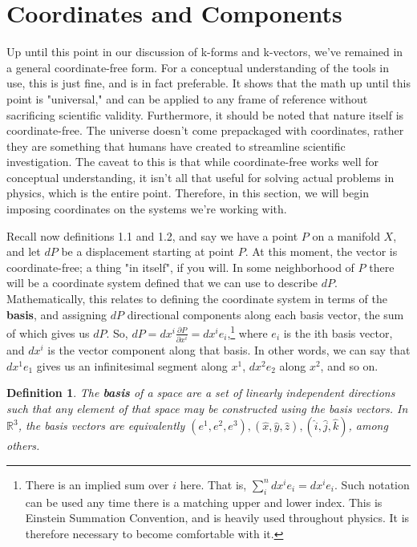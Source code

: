 \documentclass{book}
\newtheorem{defn}[equation]{Definition}
\begin{document}
\section{Coordinates and Components} 





Up until this point in our discussion of k-forms and k-vectors, we've remained in a general coordinate-free form. For a conceptual understanding of the tools in use, this is just fine, and is in fact preferable. It shows that the math up until this point is "universal," and can be applied to any frame of reference without sacrificing scientific validity. Furthermore, it should be noted that nature itself is coordinate-free. The universe doesn't come prepackaged with coordinates, rather they are something that humans have created to streamline scientific investigation. The caveat to this is that while coordinate-free works well for conceptual understanding, it isn't all that useful for solving actual problems in physics, which is the entire point. Therefore, in this section, we will begin imposing coordinates on the systems we're working with. 


Recall now definitions 1.1 and 1.2, and say we have a point $P$ on a manifold $X$, and let $dP$ be a displacement starting at point $P$. At this moment, the vector is coordinate-free; a thing "in itself", if you will. In some neighborhood of $P$ there will be a coordinate system defined that we can use to describe $dP$. Mathematically, this relates to defining the coordinate system in terms of the \textbf{basis}, and assigning $dP$ directional components  along each basis vector, the sum of which gives us $dP$. So, $dP = dx^i \frac{\partial P}{\partial x^i} = dx^i e_i$,\footnote{There is an implied sum over $i$ here. That is, $\sum_i^n dx^i e_i = dx^i e_i$. Such notation can be used any time there is a matching upper and lower index. This is Einstein Summation Convention, and is heavily used throughout physics. It is therefore necessary to become comfortable with it.} where $e_i$ is the ith basis vector, and $dx^i$ is the vector component along that basis. In other words, we can say that $dx^1e_1$ gives us an infinitesimal segment along $x^1$, $dx^2e_2$ along $x^2$, and so on. 


\begin{defn}
	The \textbf{basis} of a space are a set of linearly independent directions such that any element of that space may be constructed using the basis vectors. In $\mathbb{R}^3$, the basis vectors are equivalently $(e^1, e^2, e^3), (\hat{x}, \hat{y}, \hat{z}), (\hat{i}, \hat{j}, \hat{k})$, among others. 
\end{defn}
\end{document}
